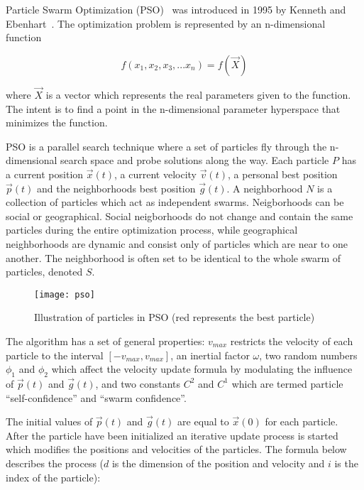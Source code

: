 Particle Swarm Optimization (PSO)~\cite{Das2008} was introduced in 1995 by Kenneth and Ebenhart~\cite{eberhart1995new}. The optimization problem is represented by an n-dimensional function

\begin{equation}
  f(x_1,x_2,x_3,...x_n) = f(\vec{X})
\end{equation}

where $\vec{X}$ is a vector which represents the real parameters given to the function. The intent is to find a point in the n-dimensional parameter hyperspace that minimizes the function.

PSO is a parallel search technique where a set of particles  fly through the n-dimensional search space and probe solutions along the way. Each particle $P$ has a current position $\vec{x}(t)$, a current velocity $\vec{v}(t)$, a personal best position $\vec{p}(t)$ and the neighborhoods best position $\vec{g}(t)$. A neighborhood $N$ is a collection of particles which act as independent swarms. Neigborhoods can be social or geographical. Social neigborhoods do not change and contain the same particles during the entire optimization process, while geographical neighborhoods are dynamic and consist only of particles which are near to one another. The neighborhood is often set to be identical to the whole swarm of particles, denoted $S$.

\begin{figure}[H]
  \centering
  \texttt{[image: pso]}
  \caption{Illustration of particles in PSO (red represents the best particle)}
  \label{fig:pso}
\end{figure}

The algorithm has a set of general properties: $v_{max}$ restricts the velocity of each particle to the interval $[-v_{max},v_{max}]$, an inertial factor $\omega$, two random numbers $\phi_1$ and $\phi_2$ which affect the velocity update formula by modulating the influence of $\vec{p}(t)$ and $\vec{g}(t)$, and two constants $C^2$ and $C^1$ which are termed particle “self-confidence” and “swarm confidence”.

The initial values of $\vec{p}(t)$ and $\vec{g}(t)$ are equal to $\vec{x}(0)$ for each particle. After the particle have been initialized an iterative update process is started which modifies the positions and velocities of the particles. The formula below describes the process ($d$ is the dimension of the position and velocity and $i$ is the index of the particle):

